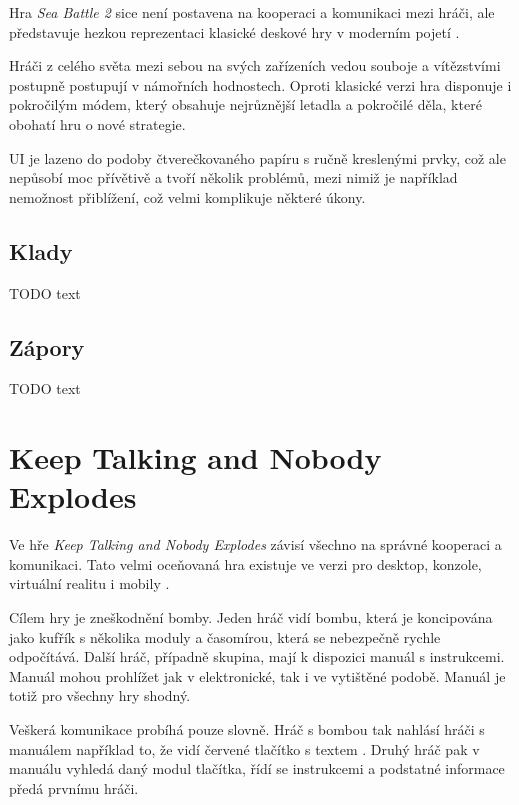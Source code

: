 Hra \emph{Sea Battle 2} sice není postavena na kooperaci a komunikaci mezi
hráči,
ale představuje hezkou reprezentaci klasické deskové hry v moderním pojetí
\cite{henrysmithinc_spaceteam}.

Hráči z celého světa mezi sebou na svých zařízeních vedou souboje a vítězstvími
postupně postupují v námořních hodnostech.
Oproti klasické verzi hra disponuje i pokročilým módem,
který obsahuje nejrůznější letadla a pokročilé děla,
které obohatí hru o nové strategie.

UI je lazeno do podoby čtverečkovaného papíru s ručně kreslenými prvky,
což ale nepůsobí moc přívětivě a tvoří několik problémů,
mezi nimiž je například nemožnost přiblížení,
což velmi komplikuje některé úkony.

\FloatBarrier

\subsection{Klady}

TODO text

\subsection{Zápory}

TODO text

\section{Keep Talking and Nobody Explodes}

Ve hře \emph{Keep Talking and Nobody Explodes} závisí všechno na správné
kooperaci a komunikaci.
Tato velmi oceňovaná hra existuje ve verzi pro desktop, konzole,
virtuální realitu i mobily \cite{steelcrategamesinc_keep}.

Cílem hry je zneškodnění bomby.
Jeden hráč vidí bombu, která je koncipována jako kufřík s několika moduly
a časomírou, která se nebezpečně rychle odpočítává.
Další hráč, případně skupina, mají k dispozici manuál s instrukcemi.
Manuál mohou prohlížet jak v elektronické, tak i ve vytištěné podobě.
Manuál je totiž pro všechny hry shodný.

Veškerá komunikace probíhá pouze slovně.
Hráč s bombou tak nahlásí hráči s manuálem například to,
že vidí červené tlačítko s textem .
Druhý hráč pak v manuálu vyhledá daný modul tlačítka, řídí se instrukcemi a
podstatné informace předá prvnímu hráči.

